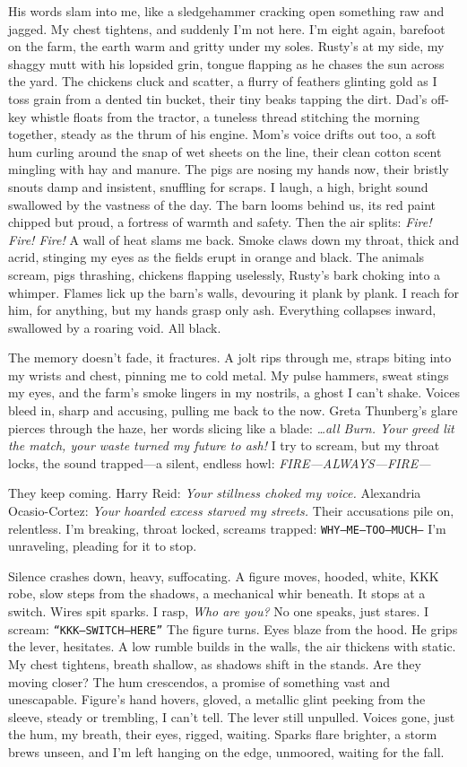 \documentclass[12pt]{article}
\newcommand{\note}[1]{\texttt{#1}}
\begin{document}
{His words slam into me, like a sledgehammer cracking open something raw and jagged. My chest tightens, and suddenly I’m not here. I’m eight again, barefoot on the farm, the earth warm and gritty under my soles. Rusty’s at my side, my shaggy mutt with his lopsided grin, tongue flapping as he chases the sun across the yard. The chickens cluck and scatter, a flurry of feathers glinting gold as I toss grain from a dented tin bucket, their tiny beaks tapping the dirt. Dad’s off-key whistle floats from the tractor, a tuneless thread stitching the morning together, steady as the thrum of his engine. Mom’s voice drifts out too, a soft hum curling around the snap of wet sheets on the line, their clean cotton scent mingling with hay and manure. The pigs are nosing my hands now, their bristly snouts damp and insistent, snuffling for scraps. I laugh, a high, bright sound swallowed by the vastness of the day. The barn looms behind us, its red paint chipped but proud, a fortress of warmth and safety. Then the air splits: \textit{Fire! Fire! Fire!} A wall of heat slams me back. Smoke claws down my throat, thick and acrid, stinging my eyes as the fields erupt in orange and black. The animals scream, pigs thrashing, chickens flapping uselessly, Rusty’s bark choking into a whimper. Flames lick up the barn’s walls, devouring it plank by plank. I reach for him, for anything, but my hands grasp only ash. Everything collapses inward, swallowed by a roaring void. All black.

The memory doesn’t fade, it fractures. A jolt rips through me, straps biting into my wrists and chest, pinning me to cold metal. My pulse hammers, sweat stings my eyes, and the farm’s smoke lingers in my nostrils, a ghost I can’t shake. Voices bleed in, sharp and accusing, pulling me back to the now. Greta Thunberg’s glare pierces through the haze, her words slicing like a blade: \textit{…all Burn. Your greed lit the match, your waste turned my future to ash!} I try to scream, but my throat locks, the sound trapped—a silent, endless howl: \textit{FIRE—ALWAYS—FIRE—}

They keep coming. Harry Reid: \textit{Your stillness choked my voice.} Alexandria Ocasio-Cortez: \textit{Your hoarded excess starved my streets.} Their accusations pile on, relentless. I’m breaking, throat locked, screams trapped: \note{WHY—ME—TOO—MUCH—} I’m unraveling, pleading for it to stop.

Silence crashes down, heavy, suffocating. A figure moves, hooded, white, KKK robe, slow steps from the shadows, a mechanical whir beneath. It stops at a switch. Wires spit sparks. I rasp, \textit{Who are you?} No one speaks, just stares. I scream: \note{“KKK—SWITCH—HERE”} The figure turns. Eyes blaze from the hood. He grips the lever, hesitates. A low rumble builds in the walls, the air thickens with static. My chest tightens, breath shallow, as shadows shift in the stands. Are they moving closer? The hum crescendos, a promise of something vast and unescapable. Figure’s hand hovers, gloved, a metallic glint peeking from the sleeve, steady or trembling, I can’t tell. The lever still unpulled. Voices gone, just the hum, my breath, their eyes, rigged, waiting. Sparks flare brighter, a storm brews unseen, and I’m left hanging on the edge, unmoored, waiting for the fall.

}
\end{document}
